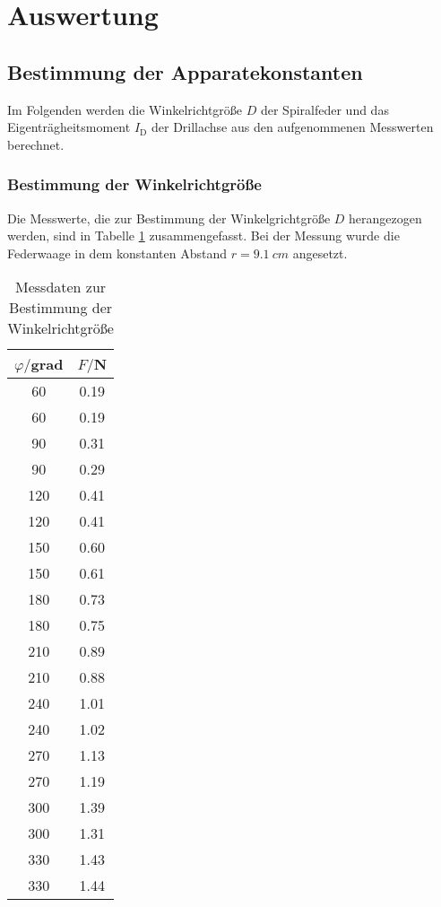 \section{Auswertung}
\label{sec:Auswertung}
\subsection{Bestimmung der Apparatekonstanten}
Im Folgenden werden die Winkelrichtgröße $D$ der Spiralfeder und das
Eigenträgheitsmoment $I_{\text{D}}$ der Drillachse aus den aufgenommenen
Messwerten berechnet.
\subsubsection{Bestimmung der Winkelrichtgröße}
Die Messwerte, die zur Bestimmung der Winkelgrichtgröße $D$ herangezogen werden,
sind in Tabelle \ref{tab:winkelrichtgroesse} zusammengefasst. Bei der Messung wurde die
Federwaage in dem konstanten Abstand $r=\SI{9.1}{cm}$ angesetzt.

\begin{table}[H] %
\centering
\caption{Messdaten zur Bestimmung der Winkelrichtgröße}
\label{tab:winkelrichtgroesse}
\begin{tabular}{c c}
\toprule
$\varphi/$grad & $F/$N \\
\midrule
 60	& 0.19 \\
 60	& 0.19 \\
 90	& 0.31 \\
 90	& 0.29 \\
120 &	0.41 \\
120 &	0.41 \\
150 &	0.60 \\
150 &	0.61 \\
180 &	0.73 \\
180 &	0.75 \\
210 &	0.89 \\
210 &	0.88 \\
240 &	1.01 \\
240 &	1.02 \\
270 &	1.13 \\
270 &	1.19 \\
300 &	1.39 \\
300 &	1.31 \\
330 &	1.43 \\
330 &	1.44 \\
\bottomrule
\end{tabular}
\end{table}

